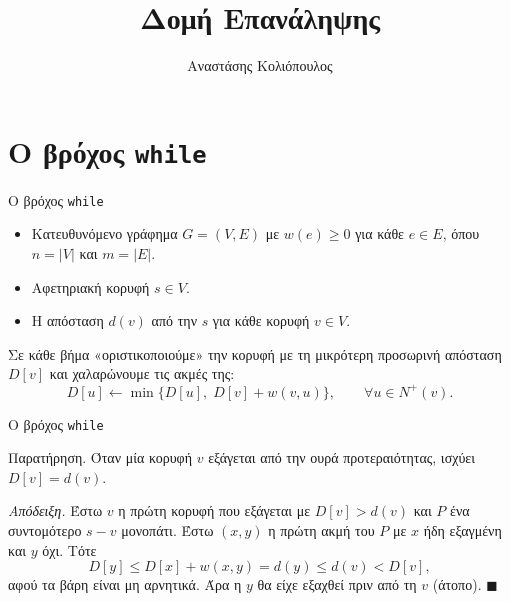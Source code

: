 \documentclass[t,aspectratio=169,9pt]{beamer}
\title{Δομή Επανάληψης}
\author{Αναστάσης Κολιόπουλος}
\date{}
\begin{document}
\pdptitleframe
{}

\section{Ο βρόχος \texttt{while}}

\begin{frame}{Ο βρόχος \texttt{while}}
  \pause
  \begin{itemize}
    \item Κατευθυνόμενο γράφημα $G = (V, E)$ με $w(e) \geq 0$ για κάθε $e \in E$, όπου $n = |V|$ και $m = |E|$.
    \pause
    \item Αφετηριακή κορυφή $s \in V$.
  \end{itemize}
  \pause
  \pause
  \begin{itemize}
    \item Η απόσταση $d(v)$ από την $s$ για κάθε κορυφή $v \in V$.
  \end{itemize}
  \pause
  \pause
  Σε κάθε βήμα «οριστικοποιούμε» την κορυφή με τη μικρότερη προσωρινή απόσταση $D[v]$ και χαλαρώνουμε τις ακμές της:
  \[
    D[u] \gets \min\bigl\{D[u],\; D[v] + w(v, u)\bigr\}, \qquad \forall u \in N^+(v).
  \]
\end{frame}



\begin{frame}{Ο βρόχος \texttt{while}}
  \begin{block}{Παρατήρηση.}
    \pause
    Όταν μία κορυφή $v$ εξάγεται από την ουρά προτεραιότητας, ισχύει $D[v] = d(v)$.
  \end{block}
  \pause
  \begin{block}{\emph{Απόδειξη.}}
    Έστω $v$ η πρώτη κορυφή που εξάγεται με $D[v] > d(v)$ και $P$ ένα συντομότερο $s - v$ μονοπάτι.
    \pause
    Έστω $(x, y)$ η πρώτη ακμή του $P$ με $x$ ήδη εξαγμένη και $y$ όχι. Τότε
    \[
      D[y] \leq D[x] + w(x, y) = d(y) \leq d(v) < D[v],
    \]
    \pause
    αφού τα βάρη είναι μη αρνητικά. Άρα η $y$ θα είχε εξαχθεί πριν από τη $v$ (άτοπο).
    \hfill$\blacksquare$
  \end{block}
\end{frame}
\end{document}

